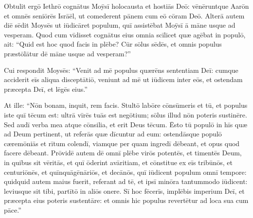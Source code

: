 Obtulit ergō Iethrō cognātus Moȳsī holocausta et hostiās Deō: vēnēruntque Aarōn et omnēs seniōrēs
Isrāēl, ut comederent pānem cum eō cōram
Deō. 
Alterā autem diē sēdit Moysēs ut iūdicāret populum, quī assistēbat Moȳsī ā māne usque
ad vesperam. 
Quod cum vīdisset cognātus
eius omnia scīlicet quæ agēbat in populō, ait: ``Quid est hoc quod facis in
plēbe? Cūr sōlus sēdēs, et omnis populus
præstōlātur dē māne usque ad vesperam?''

Cui respondit
Moysēs: ``Venit ad mē populus quærēns sententiam Deī: 
cumque acciderit
eīs aliqua disceptātiō, veniunt ad mē ut
iūdicem inter eōs, et ostendam
præcepta Deī, et lēgēs eius.''

At ille: ``Nōn bonam, inquit, rem facis. 
Stultō labōre cōnsūmeris et tū, et
populus iste quī tēcum est: ultrā vīrēs tuās est negōtium; sōlus illud
nōn poteris sustinēre. 
Sed audī verba mea atque cōnsilia, et erit Deus
tēcum. Ēsto tū populō in hīs quæ ad Deum pertinent, ut referās quæ
dīcuntur ad eum: 
ostendāsque populō cæremōniās et
rītum colendī,
viamque per quam ingredī dēbeant, et opus quod
facere dēbeant. 
Prōvidē autem dē omnī plēbe virōs
potentēs, et timentēs Deum, in quibus sit vēritās, et quī
ōderint avāritiam, et cōnstitue ex eīs
tribūnōs, et centuriōnēs, et
quīnquāgēnāriōs, et decānōs, 
quī
iūdicent populum omnī tempore: quidquid autem maius fuerit, referant ad
tē, et ipsī minōra tantummodo iūdicent: leviusque sit
tibi, partītō in aliōs onere.
Sī hoc fēcerīs, implēbis imperium Deī, et præcepta eius poteris
sustentāre: et omnis hic populus revertētur ad
loca sua cum pāce.'' 

